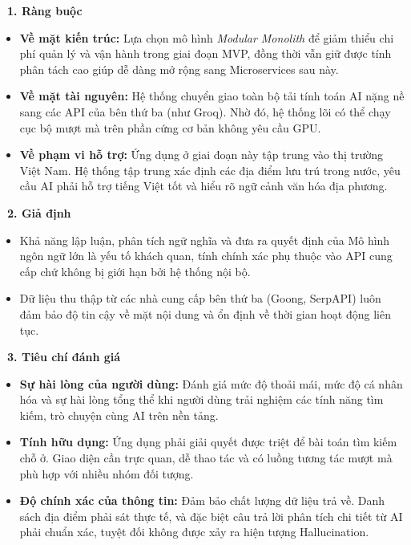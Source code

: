 \documentclass[12pt, a4paper]{article}
\begin{document}
\vspace{0.3cm}
\noindent\textbf{\textcolor{blue!80!black}{\faLink \ 1. Ràng buộc}}
\begin{itemize}[label=\textcolor{gray!70!black}{\faCaretRight}]
  \item \textbf{Về mặt kiến trúc:} Lựa chọn mô hình \textit{Modular Monolith} để giảm thiểu chi phí quản lý và vận hành trong giai đoạn MVP, đồng thời vẫn giữ được tính phân tách cao giúp dễ dàng mở rộng sang Microservices sau này.
  \item \textbf{Về mặt tài nguyên:} Hệ thống chuyển giao toàn bộ tải tính toán AI nặng nề sang các API của bên thứ ba (như Groq). Nhờ đó, hệ thống lõi có thể chạy cục bộ mượt mà trên phần cứng cơ bản không yêu cầu GPU.
  \item \textbf{Về phạm vi hỗ trợ:} Ứng dụng ở giai đoạn này tập trung vào thị trường Việt Nam. Hệ thống tập trung xác định các địa điểm lưu trú trong nước, yêu cầu AI phải hỗ trợ tiếng Việt tốt và hiểu rõ ngữ cảnh văn hóa địa phương.
\end{itemize}

\vspace{0.3cm}
\noindent\textbf{\textcolor{blue!80!black}{\faLightbulb \ 2. Giả định}}
\begin{itemize}[label=\textcolor{gray!70!black}{\faCaretRight}]
  \item Khả năng lập luận, phân tích ngữ nghĩa và đưa ra quyết định của Mô hình ngôn ngữ lớn là yếu tố khách quan, tính chính xác phụ thuộc vào API cung cấp chứ không bị giới hạn bởi hệ thống nội bộ.
  \item Dữ liệu thu thập từ các nhà cung cấp bên thứ ba (Goong, SerpAPI) luôn đảm bảo độ tin cậy về mặt nội dung và ổn định về thời gian hoạt động liên tục.
\end{itemize}

\vspace{0.3cm}
\noindent\textbf{\textcolor{blue!80!black}{\faTasks \ 3. Tiêu chí đánh giá}}
\begin{itemize}[label=\textcolor{gray!70!black}{\faCaretRight}]
  \item \textbf{Sự hài lòng của người dùng:} Đánh giá mức độ thoải mái, mức độ cá nhân hóa và sự hài lòng tổng thể khi người dùng trải nghiệm các tính năng tìm kiếm, trò chuyện cùng AI trên nền tảng.
  \item \textbf{Tính hữu dụng:} Ứng dụng phải giải quyết được triệt để bài toán tìm kiếm chỗ ở. Giao diện cần trực quan, dễ thao tác và có luồng tương tác mượt mà phù hợp với nhiều nhóm đối tượng.
  \item \textbf{Độ chính xác của thông tin:} Đảm bảo chất lượng dữ liệu trả về. Danh sách địa điểm phải sát thực tế, và đặc biệt câu trả lời phân tích chi tiết từ AI phải chuẩn xác, tuyệt đối không được xảy ra hiện tượng Hallucination.
\end{itemize}
\end{document}
